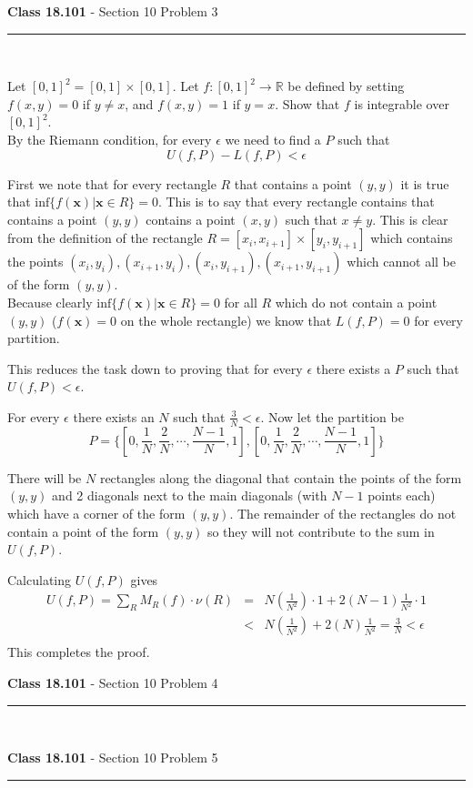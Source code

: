 \documentclass[11pt,reqno]{article}
\begin{document}
\begin{flushleft} 
\textbf{Class 18.101} - Section 10 Problem 3\\
\rule{500pt}{1pt}\\
\end{flushleft} 

Let $[0,1]^2 = [0,1] \times [0,1]$. Let $f : [0,1]^2 \to \mathbb{R}$ be defined by setting $f(x,y) = 0$ if $y \neq x$, and $f(x,y) = 1$ if $y = x$. Show that $f$ is integrable over $[0,1]^2$.\\

\noindent By the Riemann condition, for every $\epsilon$ we need to find a $P$ such that 
\[ U(f,P) - L(f,P) < \epsilon \]

First we note that for every rectangle $R$ that contains a point $(y,y)$ it is true that $\text{inf} \{ f(\textbf{x}) | \textbf{x} \in R\} = 0$. This is to say that every rectangle contains that contains a point $(y,y)$ contains a point $(x,y)$ such that $x \neq y$. This is clear from the definition of the rectangle $R = [x_i,x_{i+1}] \times  [y_i,y_{i+1}]$ which contains the points $(x_i,y_i),(x_{i+1},y_i),(x_i,y_{i+1}),(x_{i+1},y_{i+1})$ which cannot all be of the form $(y,y)$. \\
Because clearly $\text{inf} \{ f(\textbf{x}) | \textbf{x} \in R\} = 0$ for all $R$ which do not contain a point $(y,y)$ ($f(\textbf{x}) = 0$ on the whole rectangle) we know that $L(f,P) = 0$ for every partition.

This reduces the task down to proving that for every $\epsilon$ there exists a $P$ such that $U(f,P) < \epsilon$. 

\noindent For every $\epsilon$ there exists an $N$ such that $\frac{3}{N} < \epsilon$. Now let the partition be 
\[ P = \{ [0,\frac{1}{N},\frac{2}{N},\cdots,\frac{N-1}{N},1] , [0,\frac{1}{N},\frac{2}{N},\cdots,\frac{N-1}{N},1] \} \]

There will be $N$ rectangles along the diagonal that contain the points of the form $(y,y)$ and 2 diagonals next to the main diagonals (with $N-1$ points each) which have a corner of the form $(y,y)$. The remainder of the rectangles do not contain a point of the form $(y,y)$ so they will not contribute to the sum in $U(f,P)$.

\noindent Calculating $U(f,P)$ gives
\begin{eqnarray*} 
U(f,P) =   \sum_R M_R(f) \cdot \nu (R) &=& N(\frac{1}{N^2}) \cdot 1 + 2(N-1)\frac{1}{N^2} \cdot 1\\
&<& N(\frac{1}{N^2}) + 2(N)\frac{1}{N^2}  = \frac{3}{N} < \epsilon \\
\end{eqnarray*}
This completes the proof.

\begin{flushleft} 
\textbf{Class 18.101} - Section 10 Problem 4\\
\rule{500pt}{1pt}\\
\end{flushleft} 



\begin{flushleft} 
\textbf{Class 18.101} - Section 10 Problem 5\\
\rule{500pt}{1pt}\\
\end{flushleft} 
\end{document}
